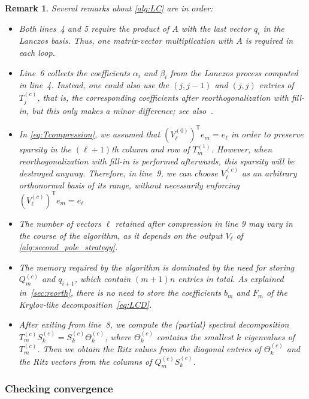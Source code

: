 \documentclass{siamart190516}
\newcommand{\Ttran}{\mathsf{T}}
\newtheorem{remark}[theorem]{Remark}
\begin{document}
\begin{remark}
    Several remarks about \cref{alg:LC} are in order:
    \begin{itemize}
        \item Both lines~4 and 5 require the product of $A$ with the last vector $q_{i}$ in the Lanczos basis. Thus, one matrix-vector multiplication with $A$ is required in each loop. 
        \item Line~6 collects the coefficients $\alpha_{i}$ and $\beta_{i}$ from the Lanczos process computed in line~4. Instead, one could also use the $(j,j-1)$ and $(j,j)$ entries of $T_{j}^{(c)}$, that is, the corresponding coefficients \emph{after} reorthogonalization with fill-in, but this only makes a minor difference; see also~\cite[p.~350]{Stewart2001}.
        \item In \cref{eq:Tcompression}, we assumed that $(V_{\ell}^{(0)})^{\Ttran} e_{m} = e_{\ell}$ in order to preserve sparsity in the $(\ell+1)$th column and row of $T_{m}^{(1)}$. However, when reorthogonalization with fill-in is performed afterwards, this sparsity will be destroyed anyway. Therefore, in line~9, we can choose $V_{\ell}^{(c)}$ as an arbitrary orthonormal basis of its range, without necessarily enforcing $(V_{\ell}^{(c)})^{\Ttran} e_{m} = e_{\ell}$
        \item The number of vectors $\ell$ retained after compression in line 9 may vary in the course of the algorithm, as it depends on the output $V_{\ell}$ of \cref{alg:second_pole_strategy}.
        \item The memory required by the algorithm is dominated by the need for storing $Q_{m}^{(c)}$ and $q_{i+1}$, which contain $(m+1)n$ entries in total. As explained
        in~\cref{sec:reorth}, there is no need to store the coefficients $b_{m}$ and $F_{m}$ of the Krylov-like decomposition~\cref{eq:LCD}.
        \item After exiting from line~8, we compute the (partial) spectral decomposition $T_{m}^{(c)}S_{k}^{(c)}=S_{k}^{(c)}\Theta_{k}^{(c)}$, where $\Theta_{k}^{(c)}$ contains the smallest $k$ eigenvalues of $T_{m}^{(c)}$.  Then we obtain the Ritz values from the diagonal entries of $\Theta_{k}^{(c)}$ and the Ritz vectors from the columns of $Q_{m}^{(c)}S_{k}^{(c)}$.
    \end{itemize}
\end{remark}

\subsubsection{Checking convergence} \label{sec:checkconvergence}
\end{document}
